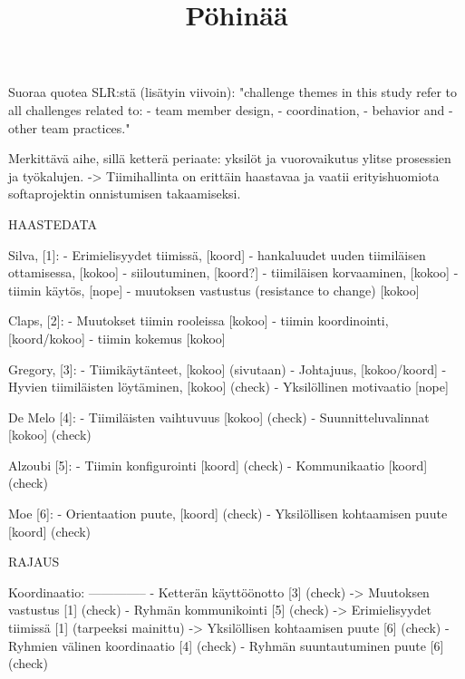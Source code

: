 \title{Pöhinää}

Suoraa quotea SLR:stä (lisätyin viivoin): 
"challenge themes in this study refer to all challenges related to:
- team member design, 
- coordination, 
- behavior and 
- other team practices."

Merkittävä aihe, sillä ketterä periaate: yksilöt ja vuorovaikutus ylitse prosessien ja työkalujen.
-> Tiimihallinta on erittäin haastavaa ja vaatii erityishuomiota softaprojektin onnistumisen takaamiseksi.

            HAASTEDATA

Silva,      [1]: 
- Erimielisyydet tiimissä,                      [koord]
- hankaluudet uuden tiimiläisen ottamisessa,    [kokoo]
- siiloutuminen,                                [koord?]
- tiimiläisen korvaaminen,                      [kokoo]
- tiimin käytös,                                [nope]
- muutoksen vastustus (resistance to change)    [kokoo]

Claps,      [2]:
- Muutokset tiimin rooleissa                    [kokoo]
- tiimin koordinointi,                          [koord/kokoo]
- tiimin kokemus                                [kokoo]

Gregory,    [3]:
- Tiimikäytänteet,                              [kokoo] (sivutaan)
- Johtajuus,                                    [kokoo/koord]
- Hyvien tiimiläisten löytäminen,               [kokoo] (check)
- Yksilöllinen motivaatio                       [nope]

De Melo     [4]:
- Tiimiläisten vaihtuvuus                       [kokoo] (check)
- Suunnitteluvalinnat                           [kokoo] (check)

Alzoubi     [5]:
- Tiimin konfigurointi                          [koord] (check)
- Kommunikaatio                                 [koord] (check)

Moe         [6]:
- Orientaation puute,                           [koord] (check)
- Yksilöllisen kohtaamisen puute                [koord] (check)

    RAJAUS

Koordinaatio:
--------------
- Ketterän käyttöönotto                     [3] (check)
    -> Muutoksen vastustus                  [1] (check)
- Ryhmän kommunikointi                      [5] (check)
    -> Erimielisyydet tiimissä              [1] (tarpeeksi mainittu)
    -> Yksilöllisen kohtaamisen puute       [6] (check)
- Ryhmien välinen koordinaatio              [4] (check)
- Ryhmän suuntautuminen puute               [6] (check)

